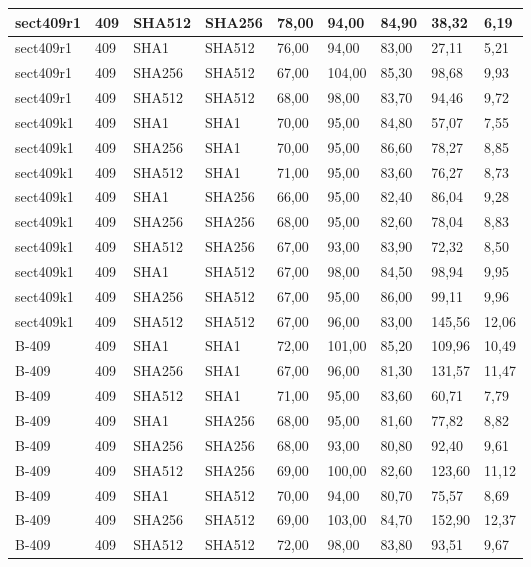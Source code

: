 \begin{longtable}{| l | l | l | l | l |l |l |l |l |}
sect409r1 & 409 & SHA512 & SHA256 & 78,00 & 94,00 & 84,90 & 38,32 & 6,19 \\ \hline 
sect409r1 & 409 & SHA1 & SHA512 & 76,00 & 94,00 & 83,00 & 27,11 & 5,21 \\ \hline 
sect409r1 & 409 & SHA256 & SHA512 & 67,00 & 104,00 & 85,30 & 98,68 & 9,93 \\ \hline 
sect409r1 & 409 & SHA512 & SHA512 & 68,00 & 98,00 & 83,70 & 94,46 & 9,72 \\ \hline 
sect409k1 & 409 & SHA1 & SHA1 & 70,00 & 95,00 & 84,80 & 57,07 & 7,55 \\ \hline 
sect409k1 & 409 & SHA256 & SHA1 & 70,00 & 95,00 & 86,60 & 78,27 & 8,85 \\ \hline 
sect409k1 & 409 & SHA512 & SHA1 & 71,00 & 95,00 & 83,60 & 76,27 & 8,73 \\ \hline 
sect409k1 & 409 & SHA1 & SHA256 & 66,00 & 95,00 & 82,40 & 86,04 & 9,28 \\ \hline 
sect409k1 & 409 & SHA256 & SHA256 & 68,00 & 95,00 & 82,60 & 78,04 & 8,83 \\ \hline 
sect409k1 & 409 & SHA512 & SHA256 & 67,00 & 93,00 & 83,90 & 72,32 & 8,50 \\ \hline 
sect409k1 & 409 & SHA1 & SHA512 & 67,00 & 98,00 & 84,50 & 98,94 & 9,95 \\ \hline 
sect409k1 & 409 & SHA256 & SHA512 & 67,00 & 95,00 & 86,00 & 99,11 & 9,96 \\ \hline 
sect409k1 & 409 & SHA512 & SHA512 & 67,00 & 96,00 & 83,00 & 145,56 & 12,06 \\ \hline 
B-409 & 409 & SHA1 & SHA1 & 72,00 & 101,00 & 85,20 & 109,96 & 10,49 \\ \hline 
B-409 & 409 & SHA256 & SHA1 & 67,00 & 96,00 & 81,30 & 131,57 & 11,47 \\ \hline 
B-409 & 409 & SHA512 & SHA1 & 71,00 & 95,00 & 83,60 & 60,71 & 7,79 \\ \hline 
B-409 & 409 & SHA1 & SHA256 & 68,00 & 95,00 & 81,60 & 77,82 & 8,82 \\ \hline 
B-409 & 409 & SHA256 & SHA256 & 68,00 & 93,00 & 80,80 & 92,40 & 9,61 \\ \hline 
B-409 & 409 & SHA512 & SHA256 & 69,00 & 100,00 & 82,60 & 123,60 & 11,12 \\ \hline 
B-409 & 409 & SHA1 & SHA512 & 70,00 & 94,00 & 80,70 & 75,57 & 8,69 \\ \hline 
B-409 & 409 & SHA256 & SHA512 & 69,00 & 103,00 & 84,70 & 152,90 & 12,37 \\ \hline 
B-409 & 409 & SHA512 & SHA512 & 72,00 & 98,00 & 83,80 & 93,51 & 9,67 \\ \hline 

\end{longtable}
